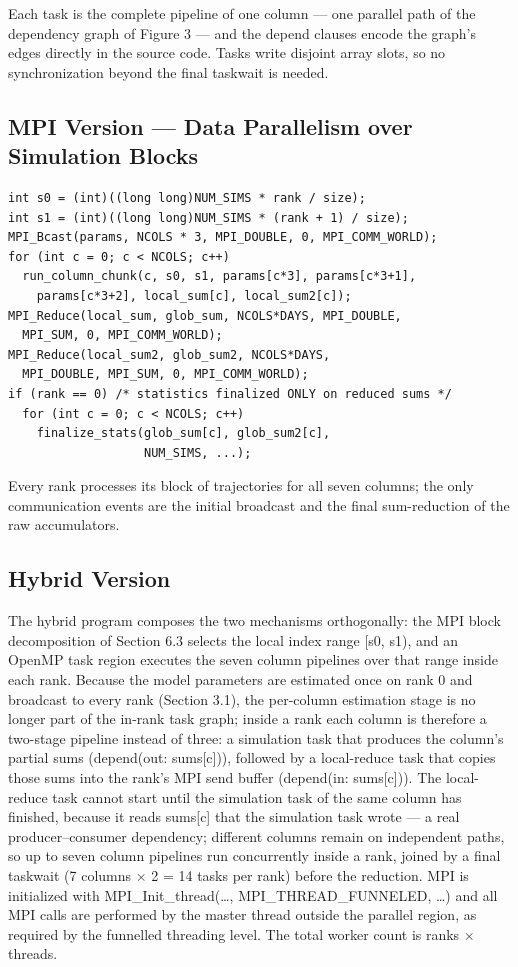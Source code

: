 \documentclass[12pt,a4paper]{article}
\begin{document}
Each task is the complete pipeline of one column --- one parallel path
of the dependency graph of Figure 3 --- and the depend clauses encode
the graph's edges directly in the source code. Tasks
write disjoint array slots, so no synchronization beyond the final
taskwait is needed.

\subsection{MPI Version --- Data Parallelism over Simulation Blocks}

\begin{verbatim}
int s0 = (int)((long long)NUM_SIMS * rank / size);
int s1 = (int)((long long)NUM_SIMS * (rank + 1) / size);
MPI_Bcast(params, NCOLS * 3, MPI_DOUBLE, 0, MPI_COMM_WORLD);
for (int c = 0; c < NCOLS; c++)
  run_column_chunk(c, s0, s1, params[c*3], params[c*3+1],
    params[c*3+2], local_sum[c], local_sum2[c]);
MPI_Reduce(local_sum, glob_sum, NCOLS*DAYS, MPI_DOUBLE,
  MPI_SUM, 0, MPI_COMM_WORLD);
MPI_Reduce(local_sum2, glob_sum2, NCOLS*DAYS,
  MPI_DOUBLE, MPI_SUM, 0, MPI_COMM_WORLD);
if (rank == 0) /* statistics finalized ONLY on reduced sums */
  for (int c = 0; c < NCOLS; c++)
    finalize_stats(glob_sum[c], glob_sum2[c],
                   NUM_SIMS, ...);
\end{verbatim}

Every rank processes its block of trajectories for all seven columns;
the only communication events are the initial broadcast and the final
sum-reduction of the raw accumulators.

\subsection{Hybrid Version}

The hybrid program composes the two mechanisms orthogonally: the MPI
block decomposition of Section 6.3 selects the local index range [s0,
s1), and an OpenMP task region executes the seven column pipelines over
that range inside each rank. Because the model parameters are estimated
once on rank 0 and broadcast to every rank (Section 3.1), the per-column
estimation stage is no longer part of the in-rank task graph; inside a
rank each column is therefore a two-stage pipeline instead of three: a
simulation task that produces the column's partial sums (depend(out:
sums[c])), followed by a local-reduce task that copies those sums
into the rank's MPI send buffer (depend(in: sums[c])). The
local-reduce task cannot start until the simulation task of the same
column has finished, because it reads sums[c] that the simulation
task wrote --- a real producer--consumer dependency; different columns
remain on independent paths, so up to seven column pipelines run
concurrently inside a rank, joined by a final taskwait (7 columns $\times$ 2 =
14 tasks per rank) before the reduction. MPI is initialized with
MPI\_Init\_thread(\ldots, MPI\_THREAD\_FUNNELED, \ldots) and all MPI
calls are performed by the master thread outside the parallel region, as
required by the funnelled threading level. The total worker count is
ranks $\times$ threads.
\end{document}
